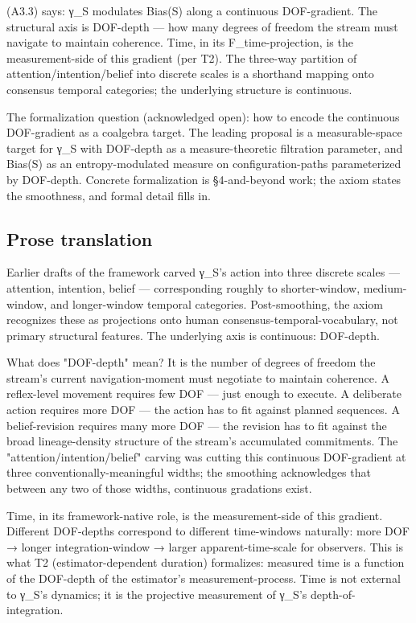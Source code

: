 \documentclass[11pt, openany]{book}
\begin{document}
(A3.3) says: γ\_\allowbreak{}S modulates Bias(S) along a continuous DOF-gradient. The structural axis is DOF-depth --- how many degrees of freedom the stream must navigate to maintain coherence. Time, in its F\_\allowbreak{}time-projection, is the measurement-side of this gradient (per T2). The three-way partition of attention/intention/belief into discrete scales is a shorthand mapping onto consensus temporal categories; the underlying structure is continuous.

The formalization question (acknowledged open): how to encode the continuous DOF-gradient as a coalgebra target. The leading proposal is a measurable-space target for γ\_\allowbreak{}S with DOF-depth as a measure-theoretic filtration parameter, and Bias(S) as an entropy-modulated measure on configuration-paths parameterized by DOF-depth. Concrete formalization is §4-and-beyond work; the axiom states the smoothness, and formal detail fills in.

\subsection{Prose translation}

Earlier drafts of the framework carved γ\_\allowbreak{}S's action into three discrete scales --- attention, intention, belief --- corresponding roughly to shorter-window, medium-window, and longer-window temporal categories. Post-smoothing, the axiom recognizes these as projections onto human consensus-temporal-vocabulary, not primary structural features. The underlying axis is continuous: DOF-depth.

What does "DOF-depth" mean? It is the number of degrees of freedom the stream's current navigation-moment must negotiate to maintain coherence. A reflex-level movement requires few DOF --- just enough to execute. A deliberate action requires more DOF --- the action has to fit against planned sequences. A belief-revision requires many more DOF --- the revision has to fit against the broad lineage-density structure of the stream's accumulated commitments. The "attention/intention/belief" carving was cutting this continuous DOF-gradient at three conventionally-meaningful widths; the smoothing acknowledges that between any two of those widths, continuous gradations exist.

Time, in its framework-native role, is the measurement-side of this gradient. Different DOF-depths correspond to different time-windows naturally: more DOF → longer integration-window → larger apparent-time-scale for observers. This is what T2 (estimator-dependent duration) formalizes: measured time is a function of the DOF-depth of the estimator's measurement-process. Time is not external to γ\_\allowbreak{}S's dynamics; it is the projective measurement of γ\_\allowbreak{}S's depth-of-integration.
\end{document}
